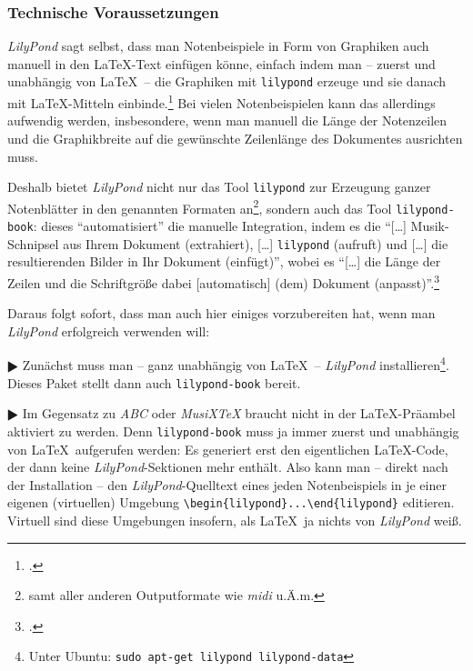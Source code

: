\subsubsection{Technische Voraussetzungen}

\textit{LilyPond} sagt selbst, dass man Notenbeispiele in Form von Graphiken auch
manuell in den \LaTeX-Text einfügen könne, einfach indem man -- zuerst und
unabhängig von \LaTeX\ -- die Graphiken mit \texttt{lilypond} erzeuge und sie
danach mit \LaTeX-Mitteln einbinde.\footcite[vgl.][20]{LilyPond2018e} Bei vielen
Notenbeispielen kann das allerdings aufwendig werden, insbesondere, wenn man
manuell die Länge der Notenzeilen und die Graphikbreite auf die gewünschte
Zeilenlänge des Dokumentes ausrichten muss.

Deshalb bietet \textit{LilyPond} nicht nur das Tool \texttt{lilypond} zur
Erzeugung ganzer Notenblätter in den genannten Formaten an\footnote{samt aller
anderen Outputformate wie \textit{midi} u.Ä.m.}, sondern auch das Tool
\texttt{lilypond-book}: dieses \enquote{automatisiert} die manuelle Integration,
indem es die \enquote{[\ldots] Musik-Schnipsel aus Ihrem Dokument (extrahiert),
[\ldots] \texttt{lilypond} (aufruft) und [\ldots] die resultierenden Bilder in
Ihr Dokument (einfügt)}, wobei es \enquote{[\ldots] die Länge der Zeilen und die
Schriftgröße dabei [automatisch] (dem) Dokument
(anpasst)}.\footcite[vgl.][20]{LilyPond2018e}

Daraus folgt sofort, dass man auch hier einiges vorzubereiten hat, wenn man
\textit{LilyPond} erfolgreich verwenden will:

$\RHD$ Zunächst muss man -- ganz unabhängig von \LaTeX\ -- \textit{LilyPond}
installieren\footnote{Unter Ubuntu: \texttt{sudo apt-get lilypond
lilypond-data}}. Dieses Paket stellt dann auch \texttt{lilypond-book} bereit.
  
$\RHD$ Im Gegensatz zu \textit{ABC} oder \textit{MusiX\TeX} braucht 
nicht in der \LaTeX-Präambel aktiviert zu werden. Denn \texttt{lilypond-book} muss
ja immer zuerst und unabhängig von \LaTeX\ aufgerufen werden: Es generiert erst den
eigentlichen \LaTeX-Code, der dann keine \textit{LilyPond}-Sektionen mehr
enthält. Also kann man -- direkt nach der Installation -- den
\textit{LilyPond}-Quelltext eines jeden Notenbeispiels in je einer eigenen
(virtuellen) Umgebung \verb|\begin{lilypond}...\end{lilypond}| editieren.
Virtuell sind diese Umgebungen insofern, als \LaTeX\ ja nichts von
\textit{LilyPond} weiß.

